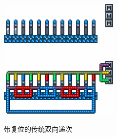 \begin{figure}
    \centering
    \includegraphics{images/265.png}
    \qquad
    \includegraphics{images/266.png}
    \caption{带复位的传统双向递次}
\end{figure}

